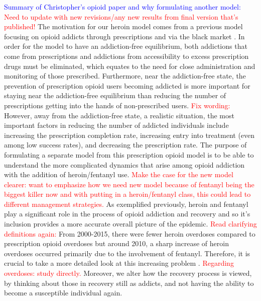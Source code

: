 \documentclass[12pt]{article}
\begin{document}
\textcolor{blue}{Summary of Christopher's opioid paper and why formulating another model:} \\
\textcolor{red}{Need to update with new revisions/any new results from final version that's published!} The motivation for our heroin model comes from a previous model focusing on opioid addicts through prescriptions and via the black market \cite{Battista}. In order for the model to have an addiction-free equilibrium, both addictions that come from prescriptions and addictions from accessibility to excess prescription drugs must be eliminated, which equates to the need for close administration and monitoring of those prescribed. Furthermore, near the addiction-free state, the prevention of prescription opioid users becoming addicted is more important for staying near the addiction-free equilibrium than reducing the number of prescriptions getting into the hands of non-prescribed users. \textcolor{red}{Fix wording:} However, away from the addiction-free state, a realistic situation, the most important factors in reducing the number of addicted individuals include increasing the prescription completion rate, increasing entry into treatment (even among low success rates), and decreasing the prescription rate. The purpose of formulating a separate model from this prescription opioid model is to be able to understand the more complicated dynamics that arise among opioid addiction with the addition of heroin/fentanyl use. \textcolor{red}{Make the case for the new model clearer: want to emphasize how we need new model because of fentanyl being the biggest killer now and with putting in a heroin/fentanyl class, this could lead to different management strategies.} As exemplified previously, heroin and fentanyl play a significant role in the process of opioid addiction and recovery and so it's inclusion provides a more accurate overall picture of the epidemic. \textcolor{red}{Read clarifying definitions again:} From 2000-2015, there were fewer heroin overdoses compared to prescription opioid overdoses but around 2010, a sharp increase of heroin overdoses occurred primarily due to the involvement of fentanyl. Therefore, it is crucial to take a more detailed look at this increasing problem \cite{CDC4}. \textcolor{red}{Regarding overdoses: study directly.} Moreover, we alter how the recovery process is viewed, by thinking about those in recovery still as addicts, and not having the ability to become a susceptible individual again. 
\end{document}
